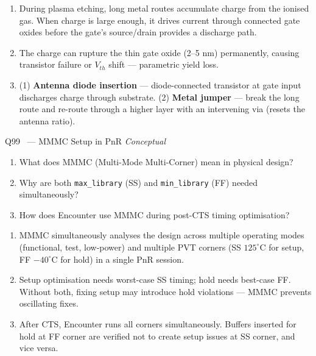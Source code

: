 \documentclass[12pt,a4paper]{article}
\newcommand{\advanced}{%
  \fbox{\textcolor{advred}{\bfseries\sffamily\small ADVANCED}}}
\begin{document}
\begin{answerbox}
\begin{enumerate}[label=\textbf{\alph*)}]
  \item During plasma etching, long metal routes accumulate charge from the ionised gas. When charge is large enough, it drives current through connected gate oxides before the gate's source/drain provides a discharge path.
  \item The charge can rupture the thin gate oxide (2--5 nm) permanently, causing transistor failure or $V_{th}$ shift --- parametric yield loss.
  \item (1) \textbf{Antenna diode insertion} --- diode-connected transistor at gate input discharges charge through substrate. (2) \textbf{Metal jumper} --- break the long route and re-route through a higher layer with an intervening via (resets the antenna ratio).
\end{enumerate}
\end{answerbox}

\begin{questionbox}{Q99 \advanced\ --- MMMC Setup in PnR \hfill\textit{Conceptual}}
\begin{enumerate}[label=\textbf{\alph*)}]
  \item What does MMMC (Multi-Mode Multi-Corner) mean in physical design?
  \item Why are both \texttt{max\_library} (SS) and \texttt{min\_library} (FF) needed simultaneously?
  \item How does Encounter use MMMC during post-CTS timing optimisation?
\end{enumerate}
\end{questionbox}

\begin{answerbox}
\begin{enumerate}[label=\textbf{\alph*)}]
  \item MMMC simultaneously analyses the design across multiple operating modes (functional, test, low-power) and multiple PVT corners (SS $125^\circ\text{C}$ for setup, FF $-40^\circ\text{C}$ for hold) in a single PnR session.
  \item Setup optimisation needs worst-case SS timing; hold needs best-case FF. Without both, fixing setup may introduce hold violations --- MMMC prevents oscillating fixes.
  \item After CTS, Encounter runs all corners simultaneously. Buffers inserted for hold at FF corner are verified not to create setup issues at SS corner, and vice versa.
\end{enumerate}
\end{answerbox}
\end{document}
